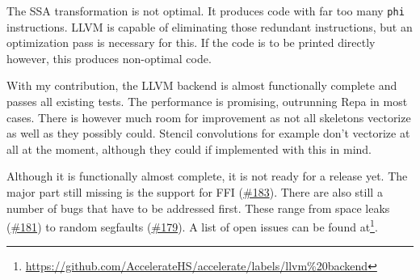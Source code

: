 \documentclass[a4paper,bibliography=totocnumbered,parskip,headsepline]{scrbook}
\begin{document}
The SSA transformation is not optimal.
It produces code with far too many \lstinline!phi! instructions.
LLVM is capable of eliminating those redundant instructions, but an optimization pass is necessary for this.
If the code is to be printed directly however, this produces non-optimal code.

With my contribution, the LLVM backend is almost functionally complete and passes all existing tests.
The performance is promising, outrunning Repa in most cases.
There is however much room for improvement as not all skeletons vectorize as well as they possibly could.
Stencil convolutions for example don't vectorize at all at the moment, although they could if implemented with this in mind.

Although it is functionally almost complete, it is not ready for a release yet.
The major part still missing is the support for FFI (\href{https://github.com/AccelerateHS/accelerate/issues/183}{\#183}).
There are also still a number of bugs that have to be addressed first.
These range from space leaks (\href{https://github.com/AccelerateHS/accelerate/issues/181}{\#181}) to random segfaults (\href{https://github.com/AccelerateHS/accelerate/issues/179}{\#179}).
A list of open issues can be found at\footnote{\url{https://github.com/AccelerateHS/accelerate/labels/llvm\%20backend}}.


\appendix

\backmatter
\sloppy
\printbibliography[heading=bibintoc]
\end{document}
